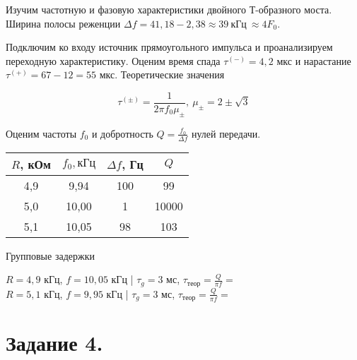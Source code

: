 	\noindent Изучим частотную и фазовую характеристики двойного Т-образного моста. 
	\noindent Ширина полосы реженции $\Delta f = 41, 18 - 2,38 \approx 39 ~ \text{кГц} ~ \approx 4 F_0$.

	\vspace*{5mm}
	\noindent Подключим ко входу источник прямоугольного импульса и проанализируем переходную характеристику. 
	Оценим время спада $\tau^{(-)} = 4,2$ мкс и нарастание $\tau^{(+)} = 67 - 12 = 55$ мкс.
	\noindent Теоретические значения

	\begin{equation*}
		\tau^{(\pm)} = \frac{1}{2 \pi f_0 \mu_{\pm}}, ~ \mu_{\pm} = 2 \pm \sqrt{3}
	\end{equation*}


	\noindent Оценим частоты $f_0$ и добротность $Q = \frac{f_0}{\Delta f}$ нулей передачи.

	\begin{table}[h!]
		\begin{center}
			\begin{tabular}{|c|c|c|c|}
				\hline
				$R$, кОм & $f_0, кГц$ & $\Delta f$, Гц  & $Q$      \\ \hline
				4,9      & 9,94       & 100             & 99       \\ \hline
				5,0      & 10,00      & 1               & 10000    \\ \hline
				5,1      & 10,05      & 98              & 103      \\ \hline
			\end{tabular}
		\end{center}
	\end{table}

	\noindent Групповые задержки

	\begin{center}
		$R = 4,9$ кГц, $f = 10,05$ кГц | $\tau_g = 3$ мс, $\tau_{теор} = \frac{Q}{\pi f} = $ \\
		$R = 5,1$ кГц, $f = 9,95$  кГц | $\tau_g = 3$ мс, $\tau_{теор} = \frac{Q}{\pi f} = $
	\end{center}

	\section*{Задание 4.}

